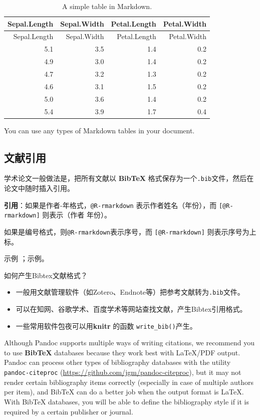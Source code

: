 \documentclass[]{article}
\begin{document}
\begin{longtable}[]{@{}rrrr@{}}
\caption{A simple table in Markdown.}\tabularnewline
\toprule
Sepal.Length & Sepal.Width & Petal.Length & Petal.Width\tabularnewline
\midrule
\endfirsthead
\toprule
Sepal.Length & Sepal.Width & Petal.Length & Petal.Width\tabularnewline
\midrule
\endhead
5.1 & 3.5 & 1.4 & 0.2\tabularnewline
4.9 & 3.0 & 1.4 & 0.2\tabularnewline
4.7 & 3.2 & 1.3 & 0.2\tabularnewline
4.6 & 3.1 & 1.5 & 0.2\tabularnewline
5.0 & 3.6 & 1.4 & 0.2\tabularnewline
5.4 & 3.9 & 1.7 & 0.4\tabularnewline
\bottomrule
\end{longtable}

You can use any types of Markdown tables in your document.

\subsection{文献引用}

学术论文一般做法是，把所有文献以 \textbf{BibTeX}
格式保存为一个\texttt{.bib}文件，然后在论文中随时插入引用。

\textbf{引用}：如果是作者-年格式，\texttt{@R-rmarkdown}
表示作者姓名（年份），而 \texttt{{[}@R-rmarkdown{]}} 则表示（作者
年份）。

如果是编号格式，则\texttt{@R-rmarkdown}表示序号，而
\texttt{{[}@R-rmarkdown{]}} 则表示序号为上标。

示例 \citet{R-rmarkdown}；示例\citep{R-rmarkdown}。

如何产生Bibtex文献格式？

\begin{itemize}
\item
  一般用文献管理软件（如Zotero、Endnote等）把参考文献转为\texttt{.bib}文件。
\item
  可以在知网、谷歌学术、百度学术等网站查找文献，产生Bibtex引用格式。
\item
  一些常用软件包夜可以用\textbf{knitr} 的函数
  \texttt{write\_bib()}产生。
\end{itemize}

Although Pandoc supports multiple ways of writing citations, we
recommend you to use \textbf{BibTeX} databases because they work best
with LaTeX/PDF output. Pandoc can process other types of bibliography
databases with the utility \texttt{pandoc-citeproc}
(\url{https://github.com/jgm/pandoc-citeproc}), but it may not render
certain bibliography items correctly (especially in case of multiple
authors per item), and BibTeX can do a better job when the output format
is LaTeX. With BibTeX databases, you will be able to define the
bibliography style if it is required by a certain publisher or journal.
\end{document}
